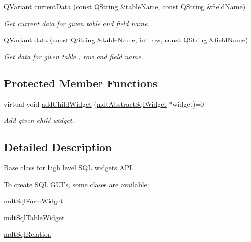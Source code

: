 \begin{DoxyCompactItemize}
QVariant \hyperlink{classmdt_sql_form_aca283557b7e2586779cb5c498d388f14}{currentData} (const QString \&tableName, const QString \&fieldName)
\begin{DoxyCompactList}\small\item\em Get current data for given table and field name. \end{DoxyCompactList}\item 
QVariant \hyperlink{classmdt_sql_form_a0c27d6a9ecbf0589f313c7193c632a62}{data} (const QString \&tableName, int row, const QString \&fieldName)
\begin{DoxyCompactList}\small\item\em Get data for given table , row and field name. \end{DoxyCompactList}\end{DoxyCompactItemize}
\subsection*{Protected Member Functions}
\begin{DoxyCompactItemize}
\item 
\hypertarget{classmdt_sql_form_ab84800b7913120c5a89d86f7d3eee8c1}{
virtual void \hyperlink{classmdt_sql_form_ab84800b7913120c5a89d86f7d3eee8c1}{addChildWidget} (\hyperlink{classmdt_abstract_sql_widget}{mdtAbstractSqlWidget} $\ast$widget)=0}
\label{classmdt_sql_form_ab84800b7913120c5a89d86f7d3eee8c1}

\begin{DoxyCompactList}\small\item\em Add given child widget. \end{DoxyCompactList}\end{DoxyCompactItemize}


\subsection{Detailed Description}
Base class for high level SQL widgets API. 

To create SQL GUI's, some clases are available:
\begin{DoxyItemize}
\item \hyperlink{classmdt_sql_form_widget}{mdtSqlFormWidget}
\item \hyperlink{classmdt_sql_table_widget}{mdtSqlTableWidget}
\item \hyperlink{classmdt_sql_relation}{mdtSqlRelation}
\end{DoxyItemize}


